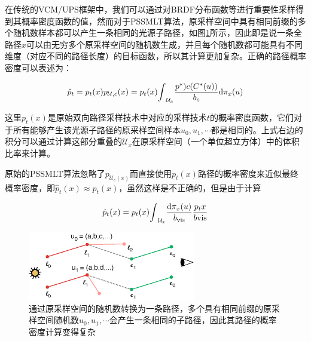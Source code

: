 在传统的VCM/UPS框架中，我们可以通过对BRDF分布函数等进行重要性采样得到其概率密度函数的值，然而对于PSSMLT算法，原采样空间中具有相同前缀的多个随机数样本都可以产生一条相同的光源子路径，如图\ref{f:mlt-mis-weight}所示，因此即是说一条全路径${x}$可以由无穷多个原采样空间的随机数生成，并且每个随机数都可能具有不同维度（对应不同的路径长度）的目标函数，所以其计算更加复杂。正确的路径概率密度可以表述为：

\begin{equation}
	\hat{p}_t=p_t({x})p_{\mathcal{U},c}({x})=p_t({x}){\rm \int}_{\mathcal{U}_x}\frac{p^{*})c(C^{*}(u))}{b_c}{\rm d}\pi_{{x}}(u)
\end{equation}

\noindent 这里$p_t({x})$是原始双向路径采样技术中对应的采样技术$t$的概率密度函数，它们对于所有能够产生该光源子路径的原采样空间样本$u_0,u_1,\cdots$都是相同的。上式右边的积分可以通过计算这部分重叠的$\mathcal{U}_{{x}}$在原采样空间（一个单位超立方体）中的体积比率来计算。

原始的PSSMLT算法忽略了$p_{\mathcal{U}_c({x})}$而直接使用$p_t({x})$路径的概率密度来近似最终概率密度，即$\hat{p}_t({x})\approx p_t({x})$，虽然这样是不正确的，但是由于计算

\begin{equation}
	\hat{p}_t({x})=p_t({x}){\rm \int}_{\mathcal{U}_{{x}}}\frac{{\rm d}\pi_{{x}}(u)}{b_{\text{vis}}}\frac{p_t{{x}}}{b\text{vis}}
\end{equation}



\begin{figure}
	\sidecaption
	\includegraphics[width=0.65\textwidth]{figures/mlt/mis-weight}
	\caption{通过原采样空间的随机数转换为一条路径，多个具有相同前缀的原采样空间随机数$u_0,u_1,\cdots$会产生一条相同的子路径，因此其路径的概率密度计算变得复杂}
	\label{f:mlt-mis-weight}
\end{figure}































